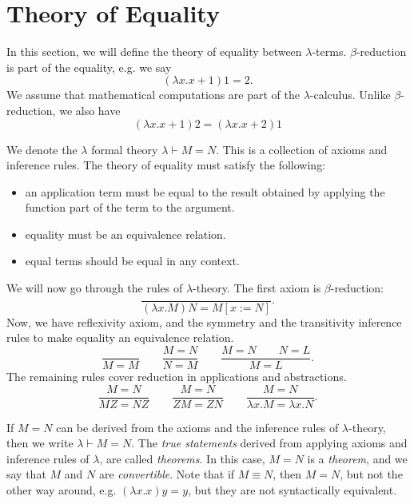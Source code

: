 \documentclass[a4paper, openany]{memoir}
\theoremstyle{definition}
\begin{document}
    \section{Theory of Equality}
    In this section, we will define the theory of equality between $\lambda$-terms. $\beta$-reduction is part of the equality, e.g. we say
    \[(\lambda x.x + 1) 1 = 2.\]
    We assume that mathematical computations are part of the $\lambda$-calculus. Unlike $\beta$-reduction, we also have
    \[(\lambda x.x + 1) 2 = (\lambda x.x + 2) 1\]

    We denote the $\lambda$ formal theory $\lambda \vdash M = N$. This is a collection of axioms and inference rules. The theory of equality must satisfy the following:
    \begin{itemize}
        \item an application term must be equal to the result obtained by applying the function part of the term to the argument.
        \item equality must be an equivalence relation.
        \item equal terms should be equal in any context.
    \end{itemize}
    
    We will now go through the rules of $\lambda$-theory. The first axiom is $\beta$-reduction:
    \[\frac{}{(\lambda x.M)N = M[x := N]}.\]
    Now, we have reflexivity axiom, and the symmetry and the transitivity inference rules to make equality an equivalence relation.
    \[\frac{}{M = M} \qquad \frac{M = N}{N = M} \qquad \frac{M = N \qquad N = L}{M = L}.\]
    The remaining rules cover reduction in applications and abstractions.
    \[\frac{M = N}{MZ = NZ} \qquad \frac{M = N}{ZM = ZN} \qquad \frac{M = N}{\lambda x.M = \lambda x.N}.\]

    If $M = N$ can be derived from the axioms and the inference rules of $\lambda$-theory, then we write $\lambda \vdash M = N$. The \emph{true statements} derived from applying axioms and inference rules of $\lambda$, are called \emph{theorems}. In this case, $M = N$ is a \emph{theorem}, and we say that $M$ and $N$ are \emph{convertible}. Note that if $M \equiv N$, then $M = N$, but not the other way around, e.g. $(\lambda x.x) y = y$, but they are not syntactically equivalent.
\end{document}
